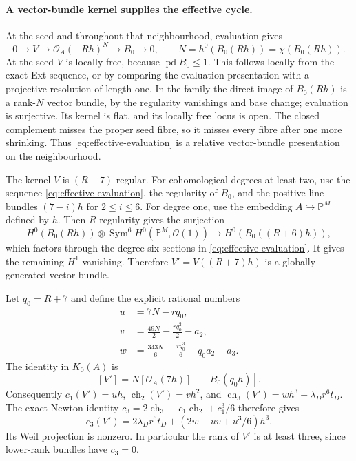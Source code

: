 \documentclass[11pt]{article}
\theoremstyle{definition}
\theoremstyle{remark}
\begin{document}
\paragraph{A vector-bundle kernel supplies the effective cycle.}
At the seed and throughout that neighbourhood, evaluation gives
\begin{equation}\label{eq:effective-evaluation}
 0\longrightarrow V\longrightarrow
    \mathcal O_A(-Rh)^N\longrightarrow B_0\longrightarrow0,
 \qquad N=h^0(B_0(Rh))=\chi(B_0(Rh)).                     
\end{equation}
At the seed $V$ is locally free, because $\operatorname{pd}B_0\le1$.
This follows locally from the exact Ext sequence, or by comparing
the evaluation presentation with a projective resolution of
length one. In the family the direct image of $B_0(Rh)$ is a
rank-$N$ vector bundle, by the regularity vanishings and base
change; evaluation is surjective. Its kernel is flat, and its
locally free locus is open. The closed complement misses the
proper seed fibre, so it misses every fibre after one more
shrinking. Thus \eqref{eq:effective-evaluation} is a relative vector-bundle
presentation on the neighbourhood.

The kernel $V$ is $(R+7)$-regular. For cohomological degrees
at least two, use the sequence \eqref{eq:effective-evaluation}, the regularity of $B_0$,
and the positive line bundles $(7-i)h$ for $2\le i\le6$.
For degree one, use the embedding $A\hookrightarrow\mathbb P^M$ defined by $h$.
Then $R$-regularity gives the surjection
\[
 H^0(B_0(Rh))\otimes\operatorname{Sym}^6H^0(\mathbb P^M,\mathcal O(1))
 \longrightarrow H^0(B_0((R+6)h)),
\]
which factors through the degree-six sections in \eqref{eq:effective-evaluation}.
It gives the remaining $H^1$ vanishing. Therefore
$V'=V((R+7)h)$ is a globally generated vector bundle.

Let $q_0=R+7$ and define the explicit rational numbers
\begin{equation}\label{eq:effective-uvw}
 \begin{split}
 u&=7N-rq_0,\\
 v&=\frac{49N}{2}-\frac{rq_0^2}{2}-a_2,\\
 w&=\frac{343N}{6}-\frac{rq_0^3}{6}-q_0a_2-a_3.
 \end{split}                                               
\end{equation}
The identity in $K_0(A)$ is
\[
 [V']=N[\mathcal O_A(7h)]-[B_0(q_0h)].
\]
Consequently $c_1(V')=uh$, $\operatorname{ch}_2(V')=vh^2$,
and $\operatorname{ch}_3(V')=wh^3+\lambda_Dr^6t_D$.
The exact Newton identity
$c_3=2\operatorname{ch}_3-c_1\operatorname{ch}_2+c_1^3/6$
therefore gives
\begin{equation}\label{eq:effective-c3}
 c_3(V')=2\lambda_Dr^6t_D+
                (2w-uv+u^3/6)h^3.                       
\end{equation}
Its Weil projection is nonzero. In particular the rank of $V'$
is at least three, since lower-rank bundles have $c_3=0$.
\end{document}
